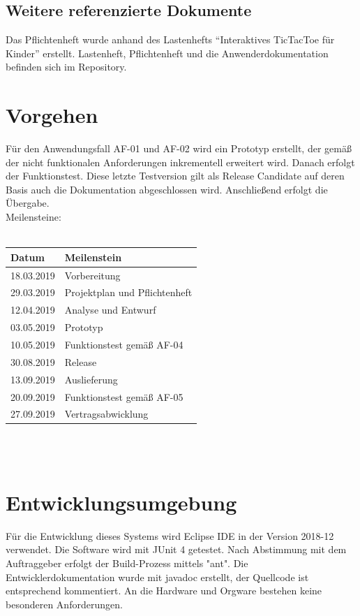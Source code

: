 \documentclass[12pt]{article}
\begin{document}
\subsection{Weitere referenzierte Dokumente}
Das Pflichtenheft wurde anhand des Lastenhefts "`Interaktives \Gls{TicTacToe} für Kinder"' erstellt. Lastenheft, Pflichtenheft und die Anwenderdokumentation befinden sich im \Gls{Repository}.
\newpage
\section{Vorgehen}
Für den Anwendungsfall AF-01 und AF-02 wird ein Prototyp erstellt, der gemäß der nicht funktionalen Anforderungen inkrementell erweitert wird. Danach erfolgt der Funktionstest. Diese letzte Testversion gilt als Release Candidate auf deren Basis auch die Dokumentation abgeschlossen wird. Anschließend erfolgt die Übergabe.\\
Meilensteine:\\\\
\begin{tabularx}{\textwidth}{|X|X|} \hline
\textbf{Datum}&\textbf{Meilenstein}\\ \hline
18.03.2019&Vorbereitung\\ \hline
29.03.2019&Projektplan und Pflichtenheft\\ \hline
12.04.2019&Analyse und Entwurf\\ \hline
03.05.2019&Prototyp\\ \hline
10.05.2019&Funktionstest gemäß AF-04\\ \hline
30.08.2019&Release\\ \hline
13.09.2019&Auslieferung\\ \hline
20.09.2019&Funktionstest gemäß AF-05\\ \hline
27.09.2019&Vertragsabwicklung\\ \hline
\end{tabularx}\\\\

\newpage


\restoregeometry

\newpage

\section{Entwicklungsumgebung}
Für die Entwicklung dieses Systems wird Eclipse IDE in der Version 2018-12 verwendet. Die Software wird mit JUnit 4 getestet. Nach Abstimmung mit dem Auftraggeber erfolgt der Build-Prozess mittels "ant". Die Entwicklerdokumentation wurde mit javadoc erstellt, der Quellcode ist entsprechend kommentiert. An die Hardware und Orgware bestehen keine besonderen Anforderungen.
\end{document}
